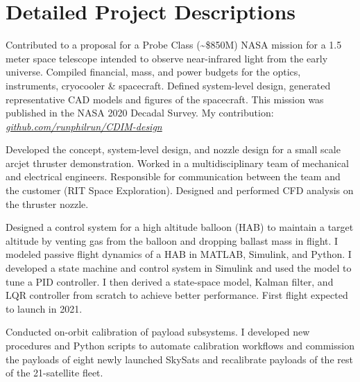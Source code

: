 \documentclass[10pt,final,sans]{resume}
\begin{document}
\break
\section{Detailed Project Descriptions}

Contributed to a proposal for a Probe Class (\textasciitilde\$850M) NASA mission
for a 1.5 meter space telescope intended to observe near-infrared light from the
early universe. Compiled financial, mass, and power budgets for the optics,
instruments, cryocooler \& spacecraft. Defined system-level design, generated
representative CAD models and figures of the spacecraft. This mission was 
published in the NASA 2020 Decadal Survey. My contribution: \href{https://github.com/runphilrun/CDIM-design/blob/master/cdim_design.pdf}{\it github.com/runphilrun/CDIM-design}

Developed the concept, system-level design, and nozzle design for a small scale
arcjet thruster demonstration. Worked in a multidisciplinary team of mechanical
and electrical engineers. Responsible for communication between the team and the
customer (RIT Space Exploration). Designed and performed CFD analysis on the
thruster nozzle.

 Designed a control system for a high altitude balloon (HAB)
to maintain a target altitude by venting gas from the balloon and dropping
ballast mass in flight. I modeled passive flight dynamics of a HAB in MATLAB,
Simulink, and Python. I developed a state machine and control system in
Simulink and used the model to tune a PID controller. I then derived a
state-space model, Kalman filter, and LQR controller from scratch to achieve
better performance. First flight expected to launch in 2021.

Conducted on-orbit calibration of payload subsystems. I developed new
procedures and Python scripts to automate calibration workflows and commission
the payloads of eight newly launched SkySats and recalibrate payloads of the
rest of the 21-satellite fleet.
\end{document}
